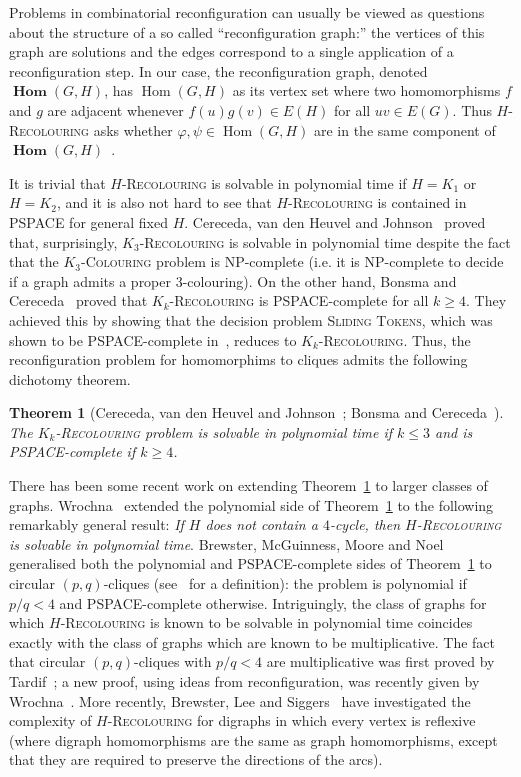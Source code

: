 \documentclass[11 pt]{amsart}
\newtheorem{thm}[equation]{Theorem}
\theoremstyle{definition}
\theoremstyle{case}
\numberwithin{equation}{section}
\newcommand\Hcol[1]{\textsc{$#1$-Colouring}}
\newcommand\Hrec[1]{\textsc{$#1$-Recolouring}}
\newcommand{\Hom}{\operatorname{Hom}}
\newcommand{\bHom}{\operatorname{\mathbf{Hom}}}
\begin{document}
Problems in combinatorial reconfiguration can usually be viewed as questions about the structure of a so called ``reconfiguration graph:''  the vertices of this graph are solutions and the edges correspond to a single application of a reconfiguration step.  In our case, the reconfiguration graph, denoted $\bHom(G,H)$, has $\Hom(G,H)$ as its vertex set where two homomorphisms $f$ and $g$ are adjacent whenever $f(u)g(v)\in E(H)$ for all $uv\in E(G)$.  Thus \Hrec{H} asks whether $\varphi,\psi\in \Hom(G,H)$ are in the same component of $\bHom(G,H)$~\cite{BrewsterNoel,3colReconfig}.

It is trivial that \Hrec{H} is solvable in polynomial time if $H=K_1$ or $H=K_2$, and it is also not hard to see that \Hrec{H} is contained in PSPACE for general fixed $H$. Cereceda, van den Heuvel and Johnson~\cite{3colReconfig} proved that, surprisingly, \Hrec{K_3} is solvable in polynomial time despite the fact that the \Hcol{K_3} problem is NP-complete (i.e. it is NP-complete to decide if a graph admits a proper $3$-colouring). On the other hand, Bonsma and Cereceda~\cite{Bonsma} proved that \Hrec{K_k} is PSPACE-complete for all $k\geq4$. They achieved this by showing that the decision problem \textsc{Sliding Tokens}, which was shown to be PSPACE-complete in~\cite{Sliding}, reduces to \Hrec{K_k}. Thus, the reconfiguration problem for homomorphims to cliques admits the following dichotomy theorem. 

\begin{thm}[Cereceda, van den Heuvel and Johnson~\cite{3colReconfig}; Bonsma and Cereceda~\cite{Bonsma}]
\label{colouringDichotomy}
The \Hrec{K_k} problem is solvable in polynomial time if $k\leq 3$ and is PSPACE-complete if $k\geq4$. 
\end{thm}

There has been some recent work on extending Theorem~\ref{colouringDichotomy} to larger classes of graphs. Wrochna~\cite{Wrochna} extended the polynomial side of Theorem~\ref{colouringDichotomy} to the following remarkably general result: \emph{If $H$ does not contain a $4$-cycle, then \Hrec{H} is solvable in polynomial time}. Brewster, McGuinness, Moore and Noel~\cite{circularReconfig} generalised both the polynomial and PSPACE-complete sides of Theorem~\ref{colouringDichotomy} to circular $(p,q)$-cliques (see~\cite{circularReconfig} for a definition): the problem is polynomial if $p/q < 4$ and PSPACE-complete otherwise. Intriguingly, the class of graphs for which \Hrec{H} is known to be solvable in polynomial time coincides exactly with the class of graphs which are known to be multiplicative. The fact that circular $(p,q)$-cliques with $p/q<4$ are multiplicative was first proved by Tardif~\cite{Tardif2005}; a new proof, using ideas from reconfiguration, was recently given by Wrochna~\cite{WrochnaMult}. More recently, Brewster, Lee and Siggers~\cite{directed} have investigated the complexity of \Hrec{H} for digraphs in which every vertex is reflexive (where digraph homomorphisms are the same as graph homomorphisms, except that they are required to preserve the directions of the arcs). 
\end{document}
